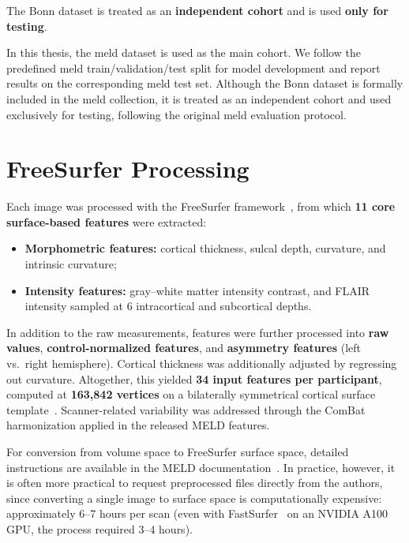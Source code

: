 \documentclass[FCD_GNN.tex]{subfiles}
\begin{document}
The Bonn dataset is treated as an \textbf{independent cohort} and is used \textbf{only for testing}.

In this thesis, the \ac{meld} dataset is used as the main cohort.
We follow the predefined \ac{meld} train/validation/test split for model development
and report results on the corresponding \ac{meld} test set.
Although the Bonn dataset is formally included in the \ac{meld} collection, it is
treated as an independent cohort and used exclusively for testing, following
the original \ac{meld} evaluation protocol.


\section{FreeSurfer Processing}
Each image was processed with the FreeSurfer framework~\cite{Fischl2012FreeSurfer}, from which \textbf{11 core surface-based features} were extracted:
\begin{itemize}
    \item \textbf{Morphometric features:} cortical thickness, sulcal depth, curvature, and intrinsic curvature;
    \item \textbf{Intensity features:} gray–white matter intensity contrast, and FLAIR intensity sampled at 6 intracortical and subcortical depths.
\end{itemize}

In addition to the raw measurements, features were further processed into 
\textbf{raw values}, \textbf{control-normalized features}, and \textbf{asymmetry features} 
(left vs.~right hemisphere). Cortical thickness was additionally adjusted by regressing out curvature. 
Altogether, this yielded \textbf{34 input features per participant}, computed at \textbf{163{,}842 vertices} 
on a bilaterally symmetrical cortical surface template~\cite{Ripart2025MELD}. Scanner-related variability was addressed through the ComBat harmonization applied in the released MELD features.

For conversion from volume space to FreeSurfer surface space, detailed instructions are available in the MELD documentation~\cite{MELDdocs}.
In practice, however, it is often more practical to request preprocessed files directly from the authors, 
since converting a single image to surface space is computationally expensive: approximately 6–7 hours per scan 
(even with FastSurfer~\cite{Henschel2020FastSurfer} on an NVIDIA A100 GPU, the process required 3–4 hours).
\end{document}

